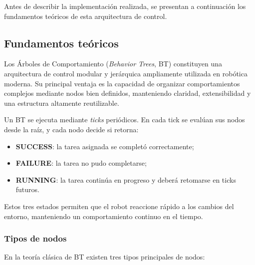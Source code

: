 \documentclass{prgrado}
\begin{document}
Antes de describir la implementación realizada, se presentan a continuación los fundamentos teóricos de esta arquitectura de control.

\subsection{Fundamentos teóricos}

Los Árboles de Comportamiento (\textit{Behavior Trees}, BT) constituyen una arquitectura de control modular y jerárquica ampliamente utilizada en robótica moderna. Su principal ventaja es la capacidad de organizar comportamientos complejos mediante nodos bien definidos, manteniendo claridad, extensibilidad y una estructura altamente reutilizable.

Un BT se ejecuta mediante \textit{ticks} periódicos. En cada tick se evalúan sus nodos desde la raíz, y cada nodo decide si retorna:

\begin{itemize}
    \item \textbf{SUCCESS}: la tarea asignada se completó correctamente;
    \item \textbf{FAILURE}: la tarea no pudo completarse;
    \item \textbf{RUNNING}: la tarea continúa en progreso y deberá retomarse en ticks futuros.
\end{itemize}

Estos tres estados permiten que el robot reaccione rápido a los cambios del entorno, manteniendo un comportamiento continuo en el tiempo.

\subsubsection{Tipos de nodos}

En la teoría clásica de BT existen tres tipos principales de nodos:
\end{document}
